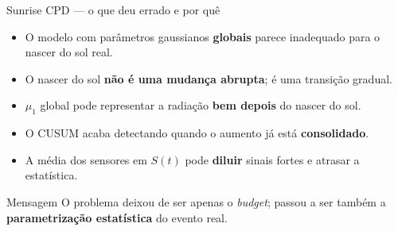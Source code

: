 \documentclass[aspectratio=169, 11pt]{beamer}
\begin{document}
\begin{frame}{Sunrise CPD --- o que deu errado e por quê}

\begin{itemize}
  \item O modelo com parâmetros gaussianos \textbf{globais} parece
        inadequado para o nascer do sol real.
  \item O nascer do sol \textbf{não é uma mudança abrupta};
        é uma transição gradual.
  \item $\mu_1$ global pode representar a radiação \textbf{bem depois}
        do nascer do sol.
  \item O CUSUM acaba detectando quando o aumento já está \textbf{consolidado}.
  \item A média dos sensores em $S(t)$ pode \textbf{diluir} sinais fortes
        e atrasar a estatística.
\end{itemize}

\vspace{0.6em}
\begin{exampleblock}{Mensagem}
O problema deixou de ser apenas o \textit{budget}; passou a ser também
a \textbf{parametrização estatística} do evento real.
\end{exampleblock}

\end{frame}
\end{document}
